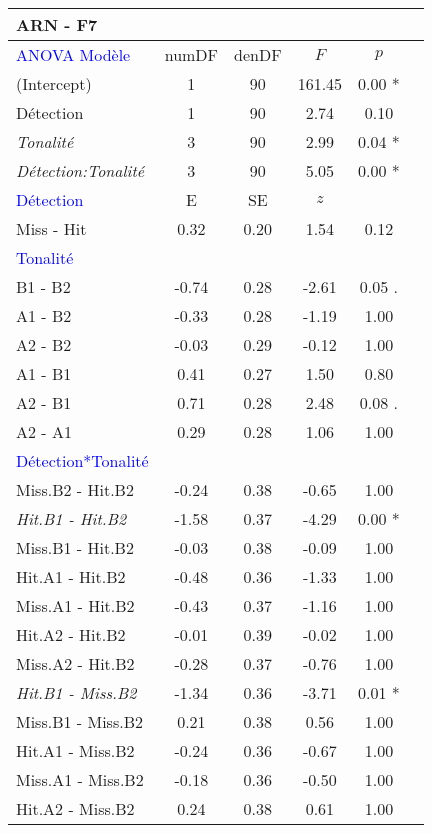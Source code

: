 \begin{landscape}
\begin{table}
\begin{multicols}{3}
\begin{tabular}{|l||*{5}{c|}}
\hline
\textbf{ARN - F7} & & & & \\
\hline
\textcolor{blue}{ANOVA Modèle} & numDF & denDF & $F$ & $p$ \\ 
\hline
(Intercept) & 1 & 90 & 161.45 & 0.00 * \\ 
Détection & 1 & 90 & 2.74 & 0.10 \\ 
\textit{Tonalité} & 3 & 90 & 2.99 & 0.04 * \\
\textit{Détection:Tonalité} & 3 & 90 & 5.05 & 0.00 * \\
\hline
\textcolor{blue}{Détection} & E & SE & $z$ & \\
\hline
Miss - Hit & 0.32 & 0.20 & 1.54 & 0.12 \\
\hline
\textcolor{blue}{Tonalité} & & & & \\
\hline
B1 - B2 & -0.74 & 0.28 & -2.61 & 0.05 . \\
A1 - B2 & -0.33 & 0.28 & -1.19 & 1.00 \\
A2 - B2 & -0.03 & 0.29 & -0.12 & 1.00 \\
A1 - B1 & 0.41 & 0.27 & 1.50 & 0.80 \\
A2 - B1 & 0.71 & 0.28 & 2.48 & 0.08 . \\
A2 - A1 & 0.29 & 0.28 & 1.06 & 1.00 \\
\hline
\textcolor{blue}{Détection*Tonalité} & & & & \\
\hline
Miss.B2 - Hit.B2 & -0.24 & 0.38 & -0.65 & 1.00 \\ 
\textit{Hit.B1 - Hit.B2} & -1.58 & 0.37 & -4.29 & 0.00 * \\ 
Miss.B1 - Hit.B2 & -0.03 & 0.38 & -0.09 & 1.00 \\ 
Hit.A1 - Hit.B2 & -0.48 & 0.36 & -1.33 & 1.00 \\ 
Miss.A1 - Hit.B2 & -0.43 & 0.37 & -1.16 & 1.00 \\ 
Hit.A2 - Hit.B2 & -0.01 & 0.39 & -0.02 & 1.00 \\ 
Miss.A2 - Hit.B2 & -0.28 & 0.37 & -0.76 & 1.00 \\ 
\textit{Hit.B1 - Miss.B2} & -1.34 & 0.36 & -3.71 & 0.01 * \\ 
Miss.B1 - Miss.B2 & 0.21 & 0.38 & 0.56 & 1.00 \\ 
Hit.A1 - Miss.B2 & -0.24 & 0.36 & -0.67 & 1.00 \\ 
Miss.A1 - Miss.B2 & -0.18 & 0.36 & -0.50 & 1.00 \\ 
Hit.A2 - Miss.B2 & 0.24 & 0.38 & 0.61 & 1.00 \\ 

\end{tabular}
\end{multicols}
\end{table}
\end{landscape}
